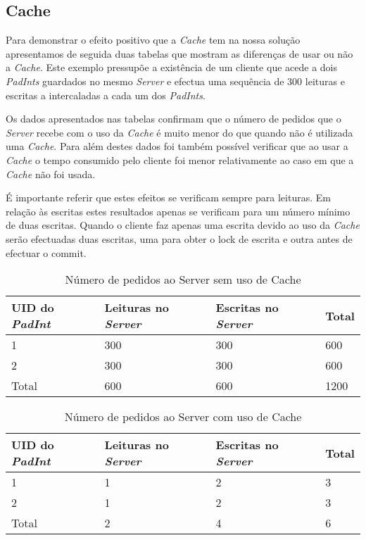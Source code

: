 \subsection{Cache}
Para demonstrar o efeito positivo que a \textit{Cache} tem na nossa solução apresentamos de seguida duas tabelas que mostram as diferenças de usar ou não a \textit{Cache}. Este exemplo pressupõe a existência de um cliente que acede a dois \textit{PadInts} guardados no mesmo \textit{Server} e efectua uma sequência de 300 leituras e escritas a intercaladas a cada um dos \textit{PadInts}.

Os dados apresentados nas tabelas confirmam que o número de pedidos que o \textit{Server} recebe com o uso da \textit{Cache} é muito menor do que quando não é utilizada uma \textit{Cache}. Para além destes dados foi também possível verificar que ao usar a \textit{Cache}  o tempo consumido pelo cliente foi menor relativamente ao caso em que a \textit{Cache} não foi usada.

É importante referir que estes efeitos se verificam sempre para leituras. Em relação às escritas estes resultados apenas se verificam para um número mínimo de duas escritas. Quando o cliente faz apenas uma escrita devido ao uso da \textit{Cache} serão efectuadas duas escritas, uma para obter o lock de escrita e outra antes de efectuar o commit.

\begin{table}[H]
\centering
\begin{tabular}{| p{1.5cm} | p{1.5cm} | p{1.5cm} | p{1.5cm} |}
\hline
\textbf{UID do \textit{PadInt}} & \textbf{Leituras no \textit{Server}} & \textbf{Escritas no \textit{Server}} & \textbf{Total} \\
\hline
1 & 300 & 300 & 600  \\
\hline
2 & 300 & 300 & 600  \\
\hline
Total & 600 & 600 & 1200  \\
\hline
\end{tabular}
\caption{Número de pedidos ao Server sem uso de Cache} \label{figAcache}
\end{table}

\begin{table}[H]
\centering
\begin{tabular}{| p{1.5cm} | p{1.5cm} | p{1.5cm} | p{1.5cm} |}
\hline
\textbf{UID do \textit{PadInt}} & \textbf{Leituras no \textit{Server}} & \textbf{Escritas no \textit{Server}} & \textbf{Total} \\
\hline
1 & 1 & 2 & 3  \\
\hline
2 & 1 & 2 & 3  \\
\hline
Total & 2 & 4 & 6  \\
\hline
\end{tabular}
\caption{Número de pedidos ao Server com uso de Cache} \label{figBcache}
\end{table}